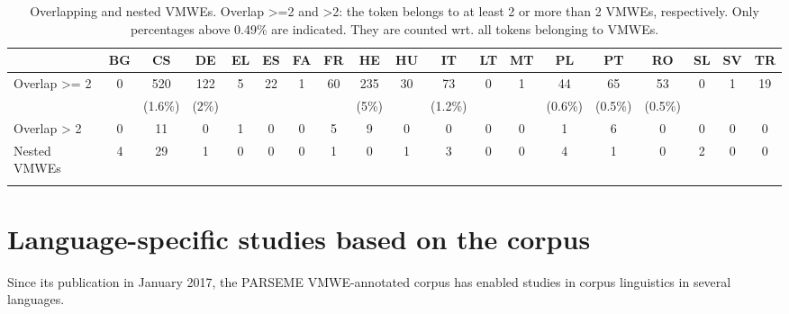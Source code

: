 \documentclass[output=paper,modfonts]{langscibook}
\begin{document}
\begin{table}[htp]
\setlength{\tabcolsep}{1pt}
\begin{small}
\begin{tabularx}{\textwidth}{lcccccccccccccccccc}
\lsptoprule
  &  BG & CS & DE & EL & ES & FA & FR & HE & HU & IT & LT & MT & PL & PT & RO & SL & SV & TR \\\midrule
Overlap >= 2 & 0 & 520 & 122 & 5 & 22 & 1 & 60 & 235 & 30 & 73 & 0 & 1 & 44 & 65 & 53 & 0 & 1 & 19 \\
  & & {\scriptsize (1.6\%)} & {\scriptsize (2\%)} & &  & &  & {\scriptsize (5\%)} & & {\scriptsize (1.2\%)} &  &  & {\scriptsize (0.6\%)} & {\scriptsize (0.5\%)} & {\scriptsize (0.5\%)} &  &  &  \\
Overlap > 2 & 0 & 11 & 0 & 1 & 0 & 0 & 5 & 9 & 0 & 0 & 0 & 0 & 1 & 6 & 0 & 0 & 0 & 0 \\
Nested VMWEs & 4 & 29 & 1 & 0 & 0 & 0 & 1 & 0 & 1 & 3 & 0 & 0 & 4 & 1 & 0 & 2 & 0 & 0 \\
\lspbottomrule
\end{tabularx}
\end{small}
\caption{Overlapping and nested VMWEs. Overlap >=2 and >2: the token belongs to at least 2 or more than 2 VMWEs, respectively. Only percentages above 0.49\% are indicated. They are counted wrt. all tokens belonging to VMWEs.}
\label{overlap}
\end{table} 


\section{Language-specific studies based on the corpus}
\label{sec:corpus-studies}
%
Since its publication in January 2017, the PARSEME VMWE-annotated corpus has enabled studies in corpus linguistics in several languages. 
\end{document}
